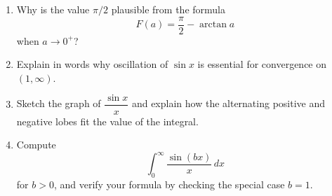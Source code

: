 \begin{enumerate}

  \item Why is the value $\pi/2$ plausible from the formula
    \[
      F(a)=\frac{\pi}{2}-\arctan a
    \]
    when $a\to 0^+$?
  \item Explain in words why oscillation of $\sin x$ is essential for convergence on $(1,\infty)$.
  \item Sketch the graph of $\dfrac{\sin x}{x}$ and explain how the alternating positive and negative lobes fit the value of the integral.
  \item Compute
    \[
      \int_0^\infty \frac{\sin(bx)}{x}\,dx
    \]
    for $b>0$, and verify your formula by checking the special case $b=1$.

\end{enumerate}
